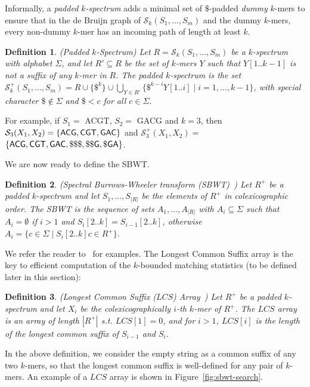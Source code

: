 \documentclass[unnumsec,webpdf,contemporary,large]{oup-authoring-template}%
\theoremstyle{thmstyleone}%
\theoremstyle{thmstyletwo}%
\theoremstyle{thmstylethree}%
\newtheorem{definition}{Definition}
\begin{document}
\noindent Informally, a \emph{padded $k$-spectrum} adds a minimal set of $\$$-padded \emph{dummy} $k$-mers to ensure that in the de Bruijn graph of $\mathcal S_k(S_1, \ldots, S_m)$ and the dummy $k$-mers, every non-dummy $k$-mer has an incoming path of length at least $k$.

\begin{definition}\label{def:padded_k_spectrum} (Padded $k$-Spectrum)
Let $R = \mathcal{S}_k(S_1, \ldots, S_m)$ be a $k$-spectrum with alphabet $\Sigma$, and let $R' \subseteq R$ be the set of $k$-mers $Y$ such that $Y[1..k-1]$ is not a suffix of any $k$-mer in $R$. The padded $k$-spectrum is the set $\mathcal{S}_k^+(S_1, \ldots, S_m) = R \cup \{\$^k\} \cup \bigcup_{Y \in R'} \{\$^{k-i} Y[1..i] \; | \; i = 1, \ldots, k-1\}$, with special character $\$ \not\in \Sigma$ and $\$ < c$ for all $c \in \Sigma$.
\end{definition}
\noindent For example, if $S_1 = $ {\sf ACGT}, $S_2 = $ {\sf GACG} and $k=3$, then $\mathcal{S}_3(X_1, X_2) = \{ {\sf ACG }, {\sf CGT }, {\sf GAC }\}$ and $\mathcal{S}_3^+(X_1, X_2) = $ $\{{\sf ACG }, {\sf CGT}, {\sf GAC }, {\sf \$\$\$}, {\sf \$\$G}, {\sf \$GA} \}$.

We are now ready to define the SBWT.

\begin{definition}\label{def:SBWT}(Spectral Burrows-Wheeler transform (SBWT)~\cite{alanko2023small}) Let $R^+$ be a padded $k$-spectrum and let $S_1, \ldots, S_{|R|}$ be the elements of $R^+$ in colexicographic order. The SBWT is the sequence of sets $A_1, \ldots, A_{|R|}$ with $A_i \subseteq \Sigma$ such that $A_i = \emptyset$ if $i > 1$ and $S_i[2..k] = S_{i-1}[2..k]$, otherwise $A_i = \{c \in \Sigma \; | \; S_i[2..k]c \in R^+\}$.
\end{definition}
\noindent We refer the reader to~\cite{alanko2023longest, alanko2024finimizers, alanko2023small} for examples. The Longest Common Suffix array is the key to efficient computation of the $k$-bounded matching statistics (to be defined later in this section):

\begin{definition}\label{def:LCS-array}(Longest Common Suffix ($LCS$) Array~\cite{alanko2023longest})     
Let $R^+$ be a padded $k$-spectrum and let $X_i$ be the colexicographically $i$-th $k$-mer of $R^+$. 
The $LCS$ array is an array of length $|R^+|$ s.t. $LCS[1] = 0$, and for $i > 1$, $LCS[i]$ is the length of the longest common suffix of $S_{i-1}$ and $S_i$.
\end{definition}
 In the above definition, we consider the empty string as a common suffix of any two $k$-mers, so that the longest common suffix is well-defined for any pair of $k$-mers.
An example of a $LCS$ array is shown in Figure~\ref{fig:sbwt-search}.
\end{document}
